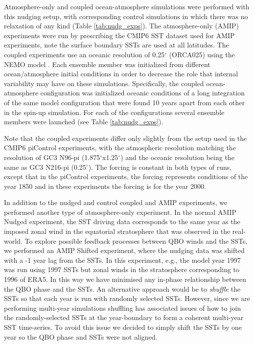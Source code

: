 Atmosphere-only and coupled ocean-atmosphere simulations were performed with this nudging setup, with corresponding control simulations in which there was no relaxation of any kind (Table \ref{tab:nudg_exps}). The atmosphere-only (AMIP) experiments were run by prescribing the CMIP6 SST dataset used for AMIP experiments, note the surface boundary SSTs are used at all latitudes. The coupled experiments use an oceanic resolution of 0.25$^\circ$ (ORCA025) using the NEMO model \citep{storkey2018}. Each ensemble member was initialized from different ocean/atmosphere initial conditions in order to decrease the role that internal variability may have on these simulations. Specifically, the coupled ocean-atmosphere configuration was initialized oceanic conditions of a long integration of the same model configuration that were found 10 years apart from each other in the spin-up simulation.
For each of the configurations several ensemble members were launched (see Table \ref{tab:nudg_exps}). 


Note that the coupled experiments differ only slightly from the setup used in the CMIP6 piControl experiments, with the atmospheric resolution matching the resolution of GC3 N96-pi (1.875$^\circ$x1.25$^\circ$) and the oceanic resolution being the same as GC3 N216-pi (0.25$^\circ$). The forcing is constant in both types of runs, except that in the piControl experiments, the forcing represents conditions of the year 1850 and in these experiments the forcing is for the year 2000. 



In addition to the nudged and control coupled and AMIP experiments, we performed another type of atmosphere-only experiment. In the normal AMIP Nudged experiment, the SST driving data corresponds to the same year as the imposed zonal wind in the equatorial stratosphere that was observed in the real-world. To explore possible feedback processes between QBO winds and the SSTs, we performed an AMIP Shifted experiment, where the nudging data was shifted with a -1 year lag from the SSTs. In this experiment, e.g., the model year 1997 was run using 1997 SSTs but zonal winds in the stratosphere corresponding to 1996 of ERA5. In this way we have minimised any in-phase relationship between the QBO phase and the SSTs. An alternative approach would be to \textit{shuffle} the SSTs so that each year is run with randomly selected SSTs. However, since we are performing multi-year simulations shuffling has associated issues of how to join the randomly-selected SSTs at the year-boundary to form a coherent multi-year SST time-series. To avoid this issue we decided to simply shift the SSTs by one year so the QBO phase and SSTs were not aligned.

